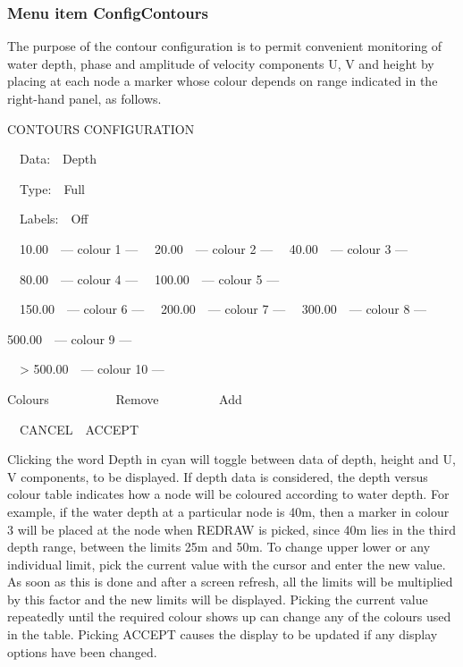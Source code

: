 \documentclass{article}
\begin{document}
\subsubsection[Menu item ConfigContours]{Menu item ConfigContours}
The purpose of the contour configuration is to permit convenient monitoring of water depth, phase and amplitude of velocity components U, V and height by placing at each node a marker whose colour depends on range indicated in the right-hand panel, as follows.

CONTOURS CONFIGURATION

\ \ Data:\ \ Depth

\ \ Type:\ \ Full

\ \ Labels:\ \ Off \newline


\ \ 10.00\ \ {}--- colour 1 ---\newline
\ \ 20.00\ \ {}--- colour 2 ---\newline
\ \ 40.00\ \ {}--- colour 3 ---

\ \ 80.00\ \ {}--- colour 4 ---\newline
\ \ 100.00\ \ {}--- colour 5 ---

\ \ 150.00\ \ {}--- colour 6 ---\newline
\ \ 200.00\ \ {}--- colour 7 ---\newline
\ \ 300.00\ \ {}--- colour 8 ---

500.00\ \ {}--- colour 9 ---

\ \ {\textgreater} 500.00\ \ {}--- colour 10 ---


\bigskip


\bigskip

Colours \ \ \ \ \ \ \ \ \ \ Remove \ \ \ \ \ \ \ \ \ Add


\bigskip

\ \ CANCEL\ \ ACCEPT


\bigskip

Clicking the word Depth in cyan will toggle between data of depth, height and U, V components, to be displayed. If depth data is considered, the depth versus colour table indicates how a node will be coloured according to water depth. For example, if the water depth at a particular node is 40m, then a marker in colour 3 will be placed at the node when REDRAW is picked, since 40m lies in the third depth range, between the limits 25m and 50m. To change upper lower or any individual limit, pick the current value with the cursor and enter the new value. As soon as this is done and after a screen refresh, all the limits will be multiplied by this factor and the new limits will be displayed. Picking the current value repeatedly until the required colour shows up can change any of the colours used in the table. Picking ACCEPT causes the display to be updated if any display options have been changed.
\end{document}
